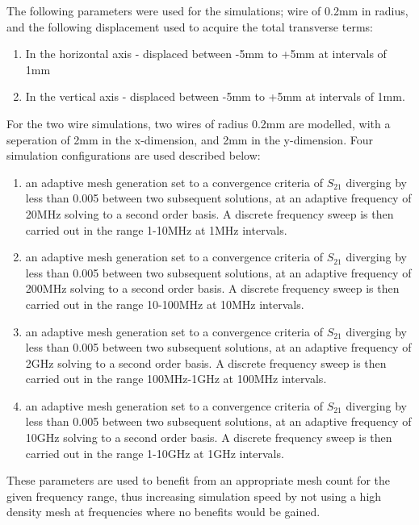 \documentclass[review, number, sort&compress]{elsarticle}
\begin{document}
The following parameters were used for the simulations; wire of 0.2mm in radius, and the following displacement used to acquire the total transverse terms:

\begin{enumerate}
\item{In the horizontal axis -  displaced between -5mm to +5mm at intervals of 1mm}
\item{In the vertical axis - displaced between -5mm to +5mm at intervals of 1mm.}
\end{enumerate}

For the two wire simulations, two wires of radius 0.2mm are modelled, with a seperation of 2mm in the x-dimension, and 2mm in the y-dimension. Four simulation configurations are used described below:

\begin{enumerate}
\item{an adaptive mesh generation set to a convergence criteria of $S_{21}$ diverging by less than 0.005 between two subsequent solutions, at an adaptive frequency of 20MHz solving to a second order basis. A discrete frequency sweep is then carried out in the range 1-10MHz at 1MHz intervals.}
\item{an adaptive mesh generation set to a convergence criteria of $S_{21}$ diverging by less than 0.005 between two subsequent solutions, at an adaptive frequency of 200MHz solving to a second order basis. A discrete frequency sweep is then carried out in the range 10-100MHz at 10MHz intervals.}
\item{an adaptive mesh generation set to a convergence criteria of $S_{21}$ diverging by less than 0.005 between two subsequent solutions, at an adaptive frequency of 2GHz solving to a second order basis. A discrete frequency sweep is then carried out in the range 100MHz-1GHz at 100MHz intervals.}
\item{an adaptive mesh generation set to a convergence criteria of $S_{21}$ diverging by less than 0.005 between two subsequent solutions, at an adaptive frequency of 10GHz solving to a second order basis. A discrete frequency sweep is then carried out in the range 1-10GHz at 1GHz intervals.}
\end{enumerate}

These parameters are used to benefit from an appropriate mesh count for the given frequency range, thus increasing simulation speed by not using a high density mesh at frequencies where no benefits would be gained.
\end{document}
